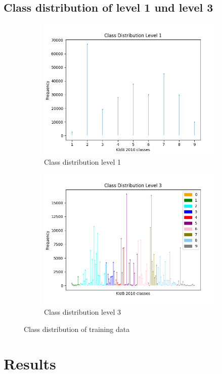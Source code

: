 \documentclass[12pt, a4paper, titlepage]{article}
\begin{document}
\subsection{Class distribution of level 1 und level 3}
\begin{figure}[hb!]
  \begin{subfigure}{.5\textwidth}
    \centering
    \includegraphics[width=.9\linewidth]{training_data_long_L1.png}
    \caption{\label{fig: F11} Class distribution level 1}
  \end{subfigure}%
  \begin{subfigure}{.5\textwidth}
    \centering
    \includegraphics[width=.9\linewidth]{training_data_long_L3.png}
    \caption{\label{fig: F12} Class distribution level 3}
  \end{subfigure}
  \caption{Class distribution of training data}
  \end{figure}


\section{Results}
\end{document}
